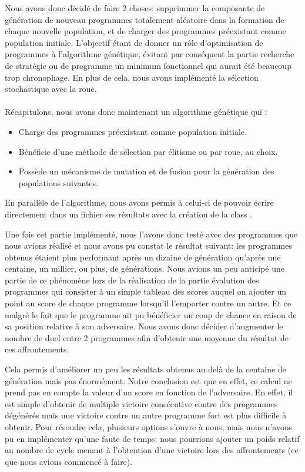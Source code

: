 \documentclass[a4paper,12pt]{article} %
\begin{document}
Nous avons donc décidé de faire 2 choses: supprimmer la composante de génération de nouveau programmes totalement aléatoire dans la formation de chaque nouvelle population, et de charger des programmes préexistant comme population initiale. L'objectif étant de donner un rôle d'optimisation de programmes à l'algorithme génétique, évitant par conséquent la partie recherche de stratégie ou de programme un minimum fonctionnel qui aurait été beaucoup trop chronophage.
En plus de cela, nous avons implémenté la sélection stochastique avec la roue.
\\ \\
Récapitulons, nous avons donc maintenant un algorithme génétique qui : 
\begin{itemize}
	\item Charge des programmes préexistant comme population initiale.
	\item Bénéficie d'une méthode de sélection par élitisme ou par roue, au choix.
	\item Possède un mécanisme de mutation et de fusion pour la génération des populations suivantes.
\end{itemize}

En parallèle de l'algorithme, nous avons permis à celui-ci de pouvoir écrire directement dans un fichier ses résultats avec la création de la class .

Une fois cet partie implémenté, nous l'avons donc testé avec des programmes que nous avions réalisé et nous avons pu constat le résultat suivant: les programmes obtenus étaient plus performant après un dizaine de génération qu'après une centaine, un millier, ou plus, de générations. Nous avions un peu anticipé une partie de ce phénomène lors de la réalisation de la partie évalution des programmes qui consister à un simple tableau des scores auquel on ajouter un point au score de chaque programme lorsqu'il l'emporter contre un autre. Et ce malgré le fait que le programme ait pu bénéficier un coup de chance en raison de sa position relative à son adversaire. Nous avons donc décider d'augmenter le nombre de duel entre 2 programmes afin d'obtenir une moyenne du résultat de ces affrontements. 

Cela permis d'améliorer un peu les résultats obtenus au delà de la centaine de génération mais pas énormément. Notre conclusion est que en effet, ce calcul ne prend pas en compte la valeur d'un score en fonction de l'adversaire. En effet, il est simple d'obtenir de multiple victoire consécutive contre des programmes dégénérés mais une victoire contre un autre programme fort est plus difficile à obtenir. Pour résoudre cela, plusieurs options s'ouvre à nous, mais nous n'avons pu en implémenter qu'une faute de temps: nous pourrions ajouter un poids relatif au nombre de cycle menant à l'obtention d'une victoire lors des affrontements (ce que nous avions commencé à faire).
\end{document}

